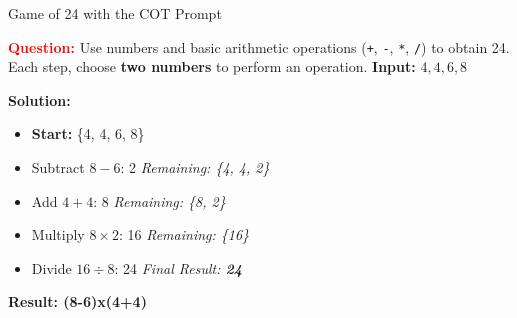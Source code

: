 \documentclass[aspectratio=169, xcolor={dvipsnames}, 10pt, brazil]{beamer}
\begin{document}
\begin{frame}{Game of 24 with the COT Prompt}
    \begin{tcolorbox}[
        colback=blue!5!white, 
        colframe=blue!80!black, 
        title=\textbf{\scriptsize \textcolor{white}{Question and Solution}}, 
        fonttitle=\bfseries\scriptsize, 
        coltitle=white, 
        boxrule=0.75mm, 
        rounded corners, 
        width=\textwidth-1.5cm, 
        enlarge left by=0.75cm, 
        enhanced
    ]

        \textbf{\textcolor{red}{Question:}}  
        Use numbers and basic arithmetic operations (\texttt{+}, \texttt{-}, \texttt{*}, \texttt{/}) to obtain 24.  
        Each step, choose \textbf{two numbers} to perform an operation.  
        \textbf{Input:} \( 4, 4, 6, 8 \)

        \vspace{0.4cm}
        
        \textbf{\textcolor{green!50!black}{Solution:}}  
        \begin{itemize}
            \item \textbf{\textcolor{blue!70!black}{Start:}} \{4, 4, 6, 8\}
            \item Subtract \(8 - 6\): \textcolor{orange!70!black}{2} \hfill \textit{Remaining: \{4, 4, 2\}}
            \item Add \(4 + 4\): \textcolor{orange!70!black}{8} \hfill \textit{Remaining: \{8, 2\}}
            \item Multiply \(8 \times 2\): \textcolor{orange!70!black}{16} \hfill \textit{Remaining: \{16\}}
            \item Divide \(16 \div 8\): \textcolor{orange!70!black}{24} \hfill \textit{Final Result: \textbf{24}}
        \end{itemize}

        \vspace{0.4cm}
        \begin{center}
            \textbf{\textcolor{blue!60!black}{Result: \huge (8-6)x(4+4)}}
        \end{center}

    \end{tcolorbox}
\end{frame}
\end{document}
